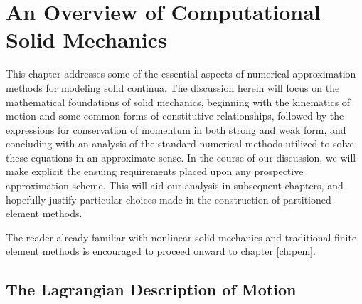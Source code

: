 \chapter{An Overview of Computational Solid Mechanics} \label{ch:solid_mechanics}
%
This chapter addresses some of the essential aspects of numerical approximation methods for modeling solid continua. The discussion herein will focus on the mathematical foundations of solid mechanics, beginning with the kinematics of motion and some common forms of constitutive relationships, followed by the expressions for conservation of momentum in both strong and weak form, and concluding with an analysis of the standard numerical methods utilized to solve these equations in an approximate sense. In the course of our discussion, we will make explicit the ensuing requirements placed upon any prospective approximation scheme. This will aid our analysis in subsequent chapters, and hopefully justify particular choices made in the construction of partitioned element methods.

The reader already familiar with nonlinear solid mechanics and traditional finite element methods is encouraged to proceed onward to chapter \ref{ch:pem}.

\newpage

\section{The Lagrangian Description of Motion}

